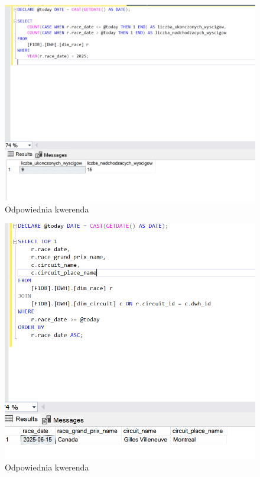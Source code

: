 \documentclass[12pt]{article}
\begin{document}
\begin{figure}[H]
    \centering   \includegraphics[width=\textwidth]{t12.png}
    \caption{Odpowiednia kwerenda}
\end{figure}

\begin{figure}[H]
    \centering   \includegraphics[width=\textwidth]{t13.png}
    \caption{Odpowiednia kwerenda}
\end{figure}
\end{document}
